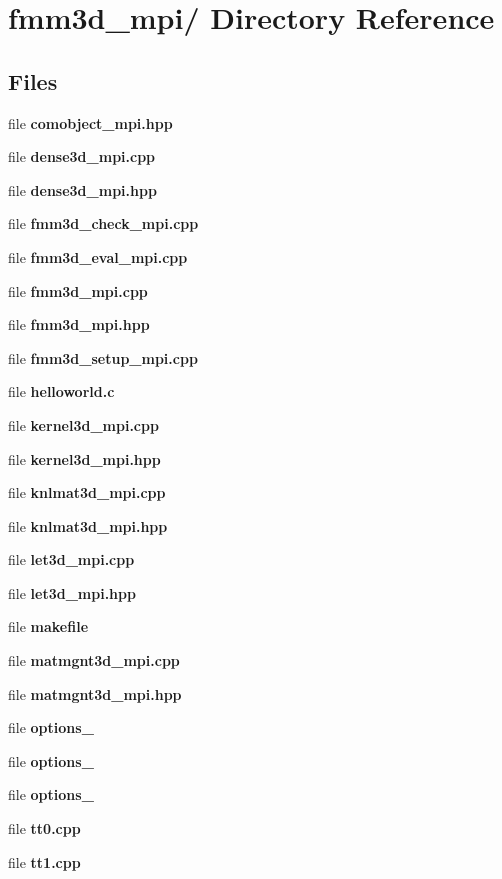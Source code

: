 \section{fmm3d\_\-mpi/ Directory Reference}
\label{dir__2Fharper_2Fkifmm3d_2Ffmm3d_5Fmpi_2F}


\subsection*{Files}
\begin{CompactItemize}
\item 
file {\bf comobject\_\-mpi.hpp}
\item 
file {\bf dense3d\_\-mpi.cpp}
\item 
file {\bf dense3d\_\-mpi.hpp}
\item 
file {\bf fmm3d\_\-check\_\-mpi.cpp}
\item 
file {\bf fmm3d\_\-eval\_\-mpi.cpp}
\item 
file {\bf fmm3d\_\-mpi.cpp}
\item 
file {\bf fmm3d\_\-mpi.hpp}
\item 
file {\bf fmm3d\_\-setup\_\-mpi.cpp}
\item 
file {\bf helloworld.c}
\item 
file {\bf kernel3d\_\-mpi.cpp}
\item 
file {\bf kernel3d\_\-mpi.hpp}
\item 
file {\bf knlmat3d\_\-mpi.cpp}
\item 
file {\bf knlmat3d\_\-mpi.hpp}
\item 
file {\bf let3d\_\-mpi.cpp}
\item 
file {\bf let3d\_\-mpi.hpp}
\item 
file {\bf makefile}
\item 
file {\bf matmgnt3d\_\-mpi.cpp}
\item 
file {\bf matmgnt3d\_\-mpi.hpp}
\item 
file {\bf options\_}
\item 
file {\bf options\_}
\item 
file {\bf options\_}
\item 
file {\bf tt0.cpp}
\item 
file {\bf tt1.cpp}
\end{CompactItemize}

